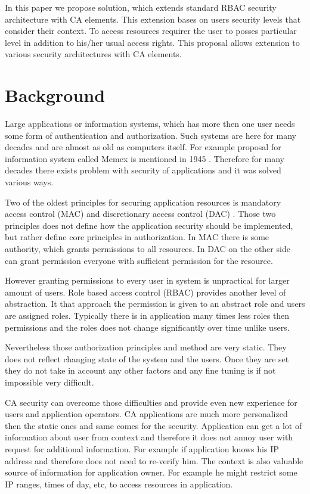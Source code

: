 \documentclass{poster15}
\begin{document}
In this paper we propose solution, which extends standard RBAC security architecture with CA elements. This extension bases on users security levels that consider their context. To access resources requirer the user to posses particular level in addition to his/her usual access rights. This proposal allows extension to various security architectures with CA elements.

\section{Background}

Large applications or information systems, which has more then one user needs some form of authentication and authorization. Such systems are here for many decades and are almost as old as computers itself. For example proposal for information system called Memex is mentioned in 1945 \cite{memex}. Therefore for many decades there exists problem with security of applications and it was solved various ways.

Two of the oldest principles for securing application resources is mandatory access control (MAC) \cite{accesscontrol} and discretionary access control (DAC) \cite{accesscontrol}. Those two principles does not define how the application security should be implemented, but rather define core principles in authorization. In MAC there is some authority, which grants permissions to all resources. In DAC on the other side can grant permission everyone with sufficient permission for the resource.

However granting permissions to every user in system is unpractical for larger amount of users. Role based access control (RBAC) \cite{rbac} provides another level of abstraction. It that approach the permission is given to an abstract role and users are assigned roles. Typically there is in application many times less roles then permissions and the roles does not change significantly over time unlike users.

Nevertheless those authorization principles and method are very static. They does not reflect changing state of the system and the users. Once they are set they do not take in account any other factors and any fine tuning is if not impossible very difficult.

CA security can overcome those difficulties and provide even new experience for users and application operators. CA applications are much more personalized then the static ones and same comes for the security. Application can get a lot of information about user from context and therefore it does not annoy user with request for additional information. For example if application knows his IP address and therefore does not need to re-verify him. The context is also valuable source of information for application owner. For example he might restrict some IP ranges, times of day, etc, to access resources in application. 
\end{document}

